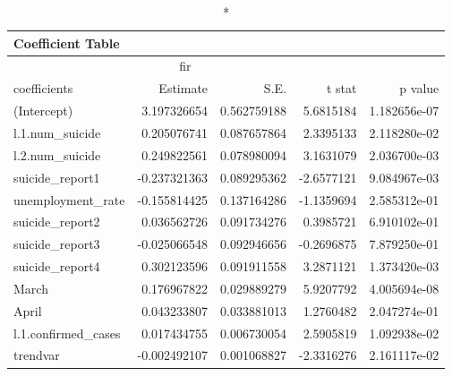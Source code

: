 \begin{longtable}{lrrrr}
\caption*{
{\large Coefficient Table}
} \\ 
\toprule
\multicolumn{4}{c}{fir} &  \\ 
\cmidrule(lr){1-4}
coefficients & Estimate & S.E. & t stat & p value \\ 
\midrule
(Intercept) & 3.197326654 & 0.562759188 & 5.6815184 & 1.182656e-07 \\ 
l.1.num\_suicide & 0.205076741 & 0.087657864 & 2.3395133 & 2.118280e-02 \\ 
l.2.num\_suicide & 0.249822561 & 0.078980094 & 3.1631079 & 2.036700e-03 \\ 
suicide\_report1 & -0.237321363 & 0.089295362 & -2.6577121 & 9.084967e-03 \\ 
unemployment\_rate & -0.155814425 & 0.137164286 & -1.1359694 & 2.585312e-01 \\ 
suicide\_report2 & 0.036562726 & 0.091734276 & 0.3985721 & 6.910102e-01 \\ 
suicide\_report3 & -0.025066548 & 0.092946656 & -0.2696875 & 7.879250e-01 \\ 
suicide\_report4 & 0.302123596 & 0.091911558 & 3.2871121 & 1.373420e-03 \\ 
March & 0.176967822 & 0.029889279 & 5.9207792 & 4.005694e-08 \\ 
April & 0.043233807 & 0.033881013 & 1.2760482 & 2.047274e-01 \\ 
l.1.confirmed\_cases & 0.017434755 & 0.006730054 & 2.5905819 & 1.092938e-02 \\ 
trendvar & -0.002492107 & 0.001068827 & -2.3316276 & 2.161117e-02 \\ 
\bottomrule
\end{longtable}


